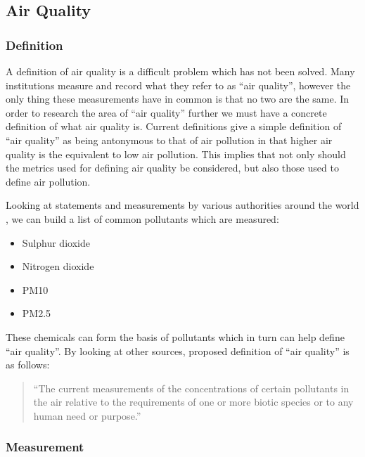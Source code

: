 \subsection{Air Quality}\label{airquality}

\subsubsection{Definition}\label{airqualitydefinition}

A definition of air quality is a difficult problem which has not been solved. Many institutions measure and record what they refer to as ``air quality'', however the only thing these measurements have in common is that no two are the same. In order to research the area of ``air quality'' further we must have a concrete definition of what air quality is. Current definitions give a simple definition of ``air quality'' as being antonymous to that of air pollution in that higher air quality is the equivalent to low air pollution\cite{bcaq}. This implies that not only should the metrics used for defining air quality be considered, but also those used to define air pollution.

Looking at statements and measurements by various authorities around the world \cite{epapollutants}\cite{airqualityobjectives}\cite{cleanairnavigation}\cite{naaqs}\cite{whoguidelines}, we can build a list of common pollutants which are measured:


\begin{itemize}
\item Sulphur dioxide
\item Nitrogen dioxide
\item PM10 
\item PM2.5
\end{itemize}

These chemicals can form the basis of pollutants which in turn can help define ``air quality''. By looking at other sources\cite{meaningsofenvironmentalterms},  proposed definition of ``air quality'' is as follows:

\begin{quote}
``The current measurements of the concentrations of certain pollutants in the air relative to the requirements of one or more biotic species or to any human need or purpose.''
\end{quote}

\subsubsection{Measurement}\label{airqualitymeasurement}

